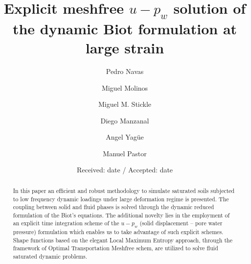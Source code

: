 \documentclass[twocolumn]{svjour3}          %
\begin{document}
\title{Explicit meshfree $u-p_w$ solution of the dynamic Biot formulation at large strain%
}


\author{Pedro Navas       \and
        Miguel Molinos \and
        Miguel M. Stickle \and
        Diego Manzanal \and
        Angel Yag\"ue \and
        Manuel Pastor
}



\date{Received: date / Accepted: date}


\maketitle

\begin{abstract}
In this paper an efficient and robust methodology to simulate saturated soils subjected to low frequency dynamic loadings under large deformation regime is presented. The coupling between solid and fluid phases is solved through the dynamic reduced formulation of the Biot's equations. The additional novelty lies in the employment of an explicit time integration scheme of the $u-p_w$ (solid displacement -- pore water pressure) formulation which enables us to take advantage of such explicit schemes. Shape functions based on the elegant Local Maximum Entropy approach, through the framework of Optimal Transportation Meshfree schem, are utilized to solve fluid saturated dynamic problems.
\end{abstract}
\end{document}
